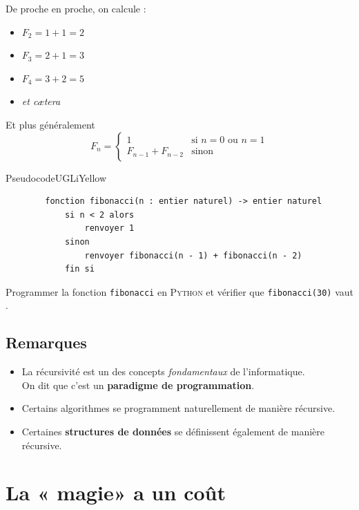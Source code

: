 \documentclass[10pt,firamath,cours]{nsi}
\begin{document}
De proche en proche, on calcule :
\begin{itemize}
    \item $F_2=1+1=2$
    \item  $F_3=2+1=3$
    \item $F_4=3+2=5$
    \item \textit{et c\ae tera}
\end{itemize}
Et plus généralement
$$F_n=\begin{cases}
        1               & \mbox{si } n=0\mbox{ ou }n=1 \\
        F_{n-1}+F_{n-2} & \mbox{sinon}
    \end{cases}$$


\begin{encadrecolore}{Pseudocode}{UGLiYellow}
    \begin{verbatim}
        fonction fibonacci(n : entier naturel) -> entier naturel
            si n < 2 alors
                renvoyer 1
            sinon
                renvoyer fibonacci(n - 1) + fibonacci(n - 2)
            fin si
\end{verbatim}
\end{encadrecolore}

\begin{exercice}
    Programmer la fonction  \texttt{fibonacci} en \textsc{Python} et vérifier que  \texttt{fibonacci(30)} vaut .
\end{exercice}


%

\subsection{Remarques}
\begin{itemize}
    \item La récursivité est un des concepts \textit{fondamentaux} de l'informatique.\\
          On dit que c'est un \textbf{paradigme de programmation}.
    \item Certains algorithmes se programment naturellement de manière récursive.
    \item Certaines \textbf{structures de données} se définissent également de manière récursive.
\end{itemize}


\section{La « magie» a un coût}
\end{document}

